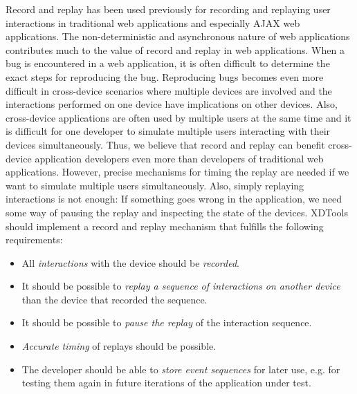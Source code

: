 Record and replay has been used previously for recording and replaying user interactions in traditional web applications and especially AJAX web applications. The non-deterministic and asynchronous nature of web applications contributes much to the value of record and replay in web applications. When a bug is encountered in a web application, it is often difficult to determine the exact steps for reproducing the bug. Reproducing bugs becomes even more difficult in cross-device scenarios where multiple devices are involved and the interactions performed on one device have implications on other devices. Also, cross-device applications are often used by multiple users at the same time and it is difficult for one developer to simulate multiple users interacting with their devices simultaneously. Thus, we believe that record and replay can benefit cross-device application developers even more than developers of traditional web applications. However, precise mechanisms for timing the replay are needed if we want to simulate multiple users simultaneously. Also, simply replaying interactions is not enough: If something goes wrong in the application, we need some way of pausing the replay and inspecting the state of the devices. XDTools should implement a record and replay mechanism that fulfills the following requirements:
\begin{itemize}
	\item All \emph{interactions} with the device should be \emph{recorded}. 
	\item It should be possible to \emph{replay a sequence of interactions on another device} than the device that recorded the sequence.
	\item It should be possible to \emph{pause the replay} of the interaction sequence.
	\item \emph{Accurate timing} of replays should be possible.
	\item The developer should be able to \emph{store event sequences} for later use, e.g. for testing them again in future iterations of the application under test.
\end{itemize}